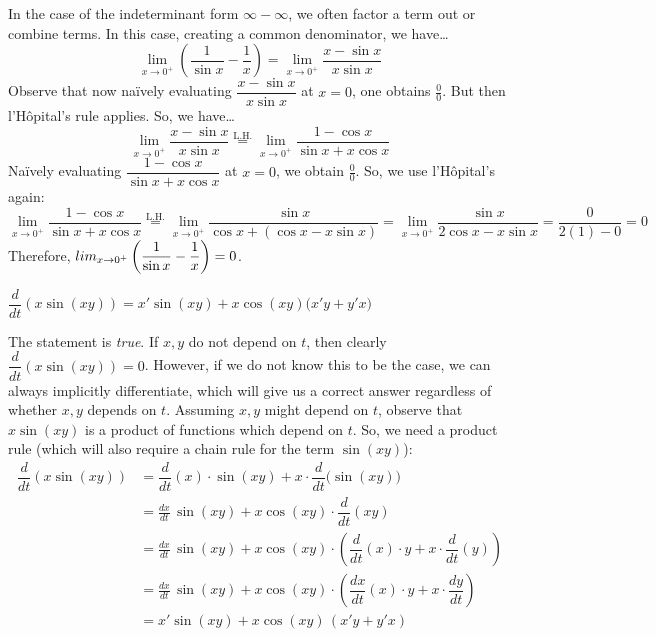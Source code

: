 \documentclass[11pt,letterpaper]{article}
\begin{document}
In the case of the indeterminant form $\infty - \infty$, we often factor a term out or combine terms. In this case, creating a common denominator, we have\dots
	\[
	\lim_{x \to 0^+} \left( \dfrac{1}{\sin x} - \dfrac{1}{x} \right)= \lim_{x \to 0^+} \dfrac{x - \sin x}{x \sin x}
	\]
Observe that now na\"ively evaluating $\dfrac{x - \sin x}{x \sin x}$ at $x= 0$, one obtains $\frac{0}{0}$. But then l'H\^opital's rule applies. So, we have\dots
	\[
	\lim_{x \to 0^+} \dfrac{x - \sin x}{x \sin x} \stackrel{\text{L.H.}}{=} \lim_{x \to 0^+} \dfrac{1 - \cos x}{\sin x + x \cos x}
	\]
Na\"ively evaluating $\dfrac{1 - \cos x}{\sin x + x \cos x}$ at $x= 0$, we obtain $\frac{0}{0}$. So, we use l'H\^opital's again: 
	\[
	\lim_{x \to 0^+} \dfrac{1 - \cos x}{\sin x + x \cos x} \stackrel{\text{L.H.}}{=} \lim_{x \to 0^+} \dfrac{\sin x}{\cos x + (\cos x - x \sin x)}= \lim_{x \to 0^+} \dfrac{\sin x}{2 \cos x - x \sin x}= \dfrac{0}{2(1) - 0}= 0
	\]
Therefore, $\\lim_{x \to 0^+} \left( \dfrac{1}{\sin x} - \dfrac{1}{x} \right)= 0$. \pvspace{1.3cm}



 $\dfrac{d}{dt} \left( x \sin(xy) \right)= x' \sin(xy) + x \cos(xy) \big(x' y + y' x)$ \pspace

\sol The statement is \textit{true}. If $x, y$ do not depend on $t$, then clearly $\dfrac{d}{dt} \left( x \sin(xy) \right)= 0$. However, if we do not know this to be the case, we can always implicitly differentiate, which will give us a correct answer regardless of whether $x, y$ depends on $t$. Assuming $x, y$ might depend on $t$, observe that $x \sin(xy)$ is a product of functions which depend on $t$. So, we need a product rule (which will also require a chain rule for the term $\sin(xy)$):
	\[
	\begin{aligned}
	\dfrac{d}{dt} \left( x \sin(xy) \right)&= \dfrac{d}{dt}(x) \cdot \sin(xy) + x \cdot \dfrac{d}{dt} \big( \sin(xy) \big) \\
	&= \frac{dx}{dt}\, \sin(xy) + x \cos(xy) \cdot \dfrac{d}{dt} (xy) \\
	&= \frac{dx}{dt}\, \sin(xy) + x \cos(xy) \cdot \left( \dfrac{d}{dt}(x) \cdot y + x \cdot \dfrac{d}{dt}(y) \right) \\
	&= \frac{dx}{dt}\, \sin(xy) + x \cos(xy) \cdot \left( \dfrac{dx}{dt}(x) \cdot y + x \cdot \dfrac{dy}{dt} \right) \\
	&= x' \sin(xy) + x \cos(xy) \,(x' y+ y' x)
	\end{aligned}
	\] \pvspace{1.3cm}
\end{document}

